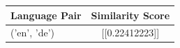 \begin{tabular}{|l|c|}
\hline
Language Pair & Similarity Score \\
\hline
('en', 'de') & [[0.22412223]] \\
\hline
\end{tabular}

